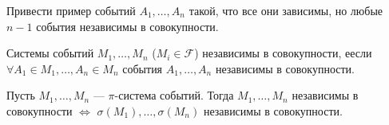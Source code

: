 \begin{exercise}{}{}
    Привести пример событий \( A_1, \ldots, A_n \)
    такой, что все они зависимы, но любые \( n - 1 \) события независимы в совокупности.
\end{exercise}

\begin{defn}{}{}
    Системы событий \( M_1, \ldots, M_n \) (\( M_i \in \mathcal{F} \))
    независимы в совокупности, еесли \( \forall A_1 \in M_1, \ldots, A_n \in M_n \)
    события \( A_1, \ldots, A_n \) независимы в совокупности.
\end{defn}

\begin{thrm}{}{}
    Пусть \( M_1, \ldots, M_n \) --- \( \pi \)-система
    событий. Тогда \( M_1, \ldots, M_n \) независимы в совокупности
    \( \Leftrightarrow \) \( \sigma(M_1), \ldots, \sigma(M_n) \)
    независимы в совокупности.
\end{thrm}

